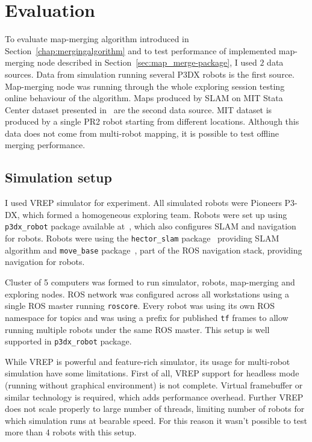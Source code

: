 \chapter{Evaluation}
\label{chap:evaluation}

To evaluate map-merging algorithm introduced in Section~\ref{chap:mergingalgorithm} and to test performance of implemented map-merging node described in Section~\ref{sec:map_merge-package}, I used $2$ data sources. Data from  simulation running several P3DX robots is the first source. Map-merging node was running through the whole exploring session testing online behaviour of the algorithm. Maps produced by \gls{SLAM} on \gls{MIT} Stata Center dataset presented in~\cite{Fallon2013} are the second data source. \gls{MIT} dataset is produced by a single PR2 robot starting from different locations. Although this data does not come from multi-robot mapping, it is possible to test offline merging performance.

\section{Simulation setup}

I used \gls{VREP} simulator for experiment. All simulated robots were Pioneers P3-DX, which formed a homogeneous exploring team. Robots were set up using \texttt{p3dx\_robot} package available at~\cite{GitHubRoboRescue}, which also configures \gls{SLAM} and navigation for robots. Robots were using the \texttt{hector\_slam} package~\cite{2013:RoboCup} providing \gls{SLAM} algorithm and \texttt{move\_base} package~\cite{Marder2016}, part of the \gls{ROS} navigation stack, providing navigation for robots.

Cluster of 5 computers was formed to run simulator, robots, map-merging and exploring nodes. \gls{ROS} network was configured across all workstations using a single \gls{ROS} master running \texttt{roscore}. Every robot was using its own \gls{ROS} namespace for topics and was using a prefix for published \texttt{tf} frames to allow running multiple robots under the same \gls{ROS} master. This setup is well supported in \texttt{p3dx\_robot} package.

While \gls{VREP} is powerful and feature-rich simulator, its usage for multi-robot simulation have some limitations. First of all, \gls{VREP} support for headless mode (running without graphical environment) is not complete. Virtual framebuffer or similar technology is required, which adds performance overhead. Further \gls{VREP} does not scale properly to large number of threads, limiting number of robots for which simulation runs at bearable speed. For this reason it wasn't possible  to test more than 4 robots with this setup.

